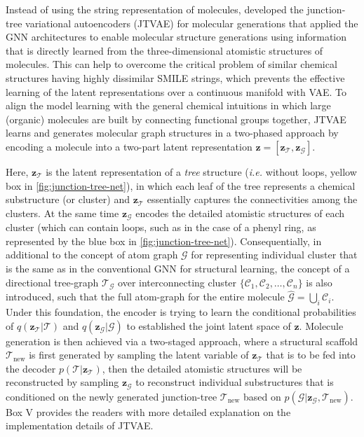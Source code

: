 Instead of using the string representation of molecules, \citet{jin2018junction} developed the junction-tree variational autoencoders (JTVAE) for molecular generations that applied the GNN architectures to enable molecular structure generations using information that is directly learned from the three-dimensional atomistic structures of molecules. This can help to overcome the critical problem of similar chemical structures having highly dissimilar SMILE strings, which prevents the effective learning of the latent representations over a continuous manifold with VAE. To align the model learning with the general chemical intuitions in which large (organic) molecules are built by connecting functional groups together,  JTVAE learns and generates molecular graph structures in a two-phased approach by encoding a molecule into a two-part latent representation $\bm{z}=[\bm{z}_\mathcal{T},\bm{z}_\mathcal{G}]$. 

Here, $\bm{z}_\mathcal{T}$ is the latent representation of a \emph{tree} structure (\emph{i.e.} without loops, yellow box in \cref{fig:junction-tree-net}), in which each leaf of the tree represents a chemical substructure (or cluster) and $\bm{z}_\mathcal{T}$ essentially captures the connectivities among the clusters. At the same time $\bm{z}_\mathcal{G}$ encodes the detailed atomistic structures of each cluster (which can contain loops, such as in the case of a phenyl ring, as represented by the blue box in \cref{fig:junction-tree-net}). Consequentially, in additional to the concept of atom graph $\mathcal{G}$ for representing individual cluster that is the same as in the conventional GNN for structural learning,\cite{duval2023hitchhiker} the concept of a directional tree-graph $\mathcal{T}_{\mathcal{G}}$ over interconnecting cluster $\{\mathcal{C}_1,\mathcal{C}_2,\ldots,\mathcal{C}_n\}$ is also introduced, such that the full atom-graph for the entire molecule $\hat{\mathcal{G}}=\bigcup_i\mathcal{C}_i$. Under this foundation, the encoder is trying to learn the conditional probabilities of $q(\bm{z}_\mathcal{T}|\mathcal{T})$ and $q(\bm{z}_\mathcal{G}|\mathcal{G})$  to established the joint latent space of $\bm{z}$. Molecule generation is then achieved via a two-staged approach, where a structural scaffold $\mathcal{T}_{\mathrm{new}}$ is first generated by sampling the latent variable of $\bm{z}_\mathcal{T}$ that is to be fed into the decoder $p(\mathcal{T}|\bm{z}_\mathcal{T})$, then the detailed atomistic structures will be reconstructed by sampling $\bm{z}_{\mathcal{G}}$ to reconstruct individual substructures that is conditioned on the newly generated junction-tree $\mathcal{T}_{\mathrm{new}}$ based on $p(\mathcal{G}|\bm{z}_\mathcal{G},\mathcal{T}_{\mathrm{new}})$. Box V provides the readers with more detailed explanation on the implementation details of JTVAE.


